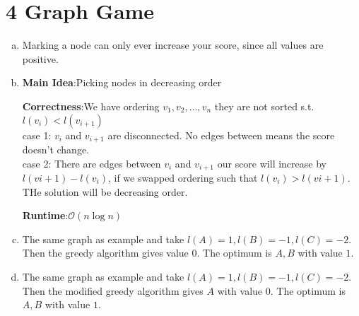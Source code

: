 \documentclass[11pt]{article}
\def\mi{\textbf{Main Idea}:}
\def\co{\textbf{Correctness}:}
\def\rt{\textbf{Runtime}:}
\newenvironment{qparts}{\begin{enumerate}[(a)]}{\end{enumerate}}
\begin{document}
	\section*{4 Graph Game}
	\begin{qparts}
		\item Marking a node can only ever increase your score, since all values are positive.
		
		\item 
		\mi Picking nodes in decreasing order
		
		\co We have ordering $v_1, v_2, \dots, v_n$ they are not sorted s.t. $l(v_i) < l(v_{i+1})$\\
		case 1: $v_i$ and $v_{i+1}$ are disconnected. No edges between means the score doesn't change.\\
		case 2: There are edges between $v_i$ and $v_{i+1}$ our score will increase by $l(v{i+1}) - l(v_i)$, if we swapped ordering such that $l(v_i) > l(v{i+1})$. THe solution will be decreasing order.
		
		\rt $\mathcal{O}(n\log n)$
		
		\item The same graph as example and take $l(A) = 1, l(B) = -1, l(C) = -2$. Then the greedy algorithm gives value $0$. The optimum is $A,B$ with value $1$.
		
		\item The same graph as example and take $l(A) = 1, l(B) = -1, l(C) = -2$. Then the modified greedy algorithm gives $A$ with value $0$. The optimum is $A,B$ with value $1$.
	\end{qparts}
\end{document}
